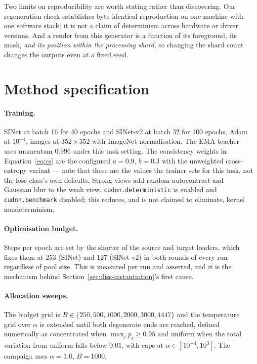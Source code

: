 \documentclass{article} %
\begin{document}
Two limits on reproducibility are worth stating rather than discovering. Our regeneration check
establishes byte-identical reproduction on one machine with one software stack; it is not a claim of
determinism across hardware or driver versions. And a render from this generator is a function of its
foreground, its mask, \emph{and its position within the processing shard}, so changing the shard count
changes the outputs even at a fixed seed.

\appendix

\section{Method specification}
\label{app:method}

\paragraph{Training.} SINet at batch 16 for 40 epochs and SINet-v2 at batch 32 for 100 epochs, Adam at
$10^{-4}$, images at $352 \times 352$ with ImageNet normalisation. The EMA teacher uses momentum
$0.996$ under this task setting. The consistency weights in Equation~\ref{eq:es} are the configured
$a = 0.9$, $b = 0.3$ with the unweighted cross-entropy variant --- note that these are the values the
trainer sets for this task, not the loss class's own defaults. Strong views add random autocontrast
and Gaussian blur to the weak view. \texttt{cudnn.deterministic} is enabled and
\texttt{cudnn.benchmark} disabled; this reduces, and is not claimed to eliminate, kernel
nondeterminism.

\paragraph{Optimisation budget.} Steps per epoch are set by the shorter of the source and target
loaders, which fixes them at $253$ (SINet) and $127$ (SINet-v2) in both rounds of every run regardless
of pool size. This is measured per run and asserted, and it is the mechanism behind
Section~\ref{sec:diss-instantiation}'s first cause.

\paragraph{Allocation sweeps.} The budget grid is $B \in \{250, 500, 1000, 2000, 3000, 4447\}$ and the
temperature grid over $\alpha$ is extended until both degenerate ends are reached, defined numerically
as concentrated when $\max_j p_j \geq 0.95$ and uniform when the total variation from uniform falls
below $0.01$, with caps at $\alpha \in [10^{-4}, 10^{3}]$. The campaign uses $\alpha = 1.0$, $B = 1000$.
\end{document}
